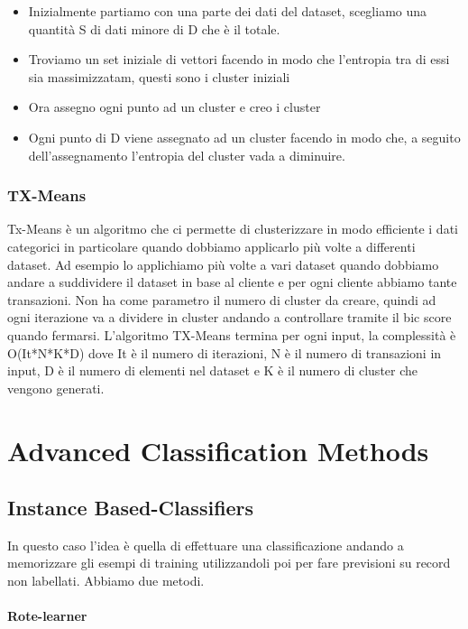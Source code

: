 \documentclass[14pt]{extreport}
\begin{document}
\begin{itemize}
    \item Inizialmente partiamo con una parte dei dati del dataset, scegliamo una quantità S di dati minore di D che è il totale.
    \item Troviamo un set iniziale di vettori facendo in modo che l'entropia tra di essi sia massimizzatam, questi sono i cluster iniziali
    \item Ora assegno ogni punto ad un cluster e creo i cluster
    \item Ogni punto di D viene assegnato ad un cluster facendo in modo che, a seguito dell'assegnamento l'entropia del cluster vada a diminuire.
\end{itemize}

\subsection{TX-Means}

Tx-Means è un algoritmo che ci permette di clusterizzare in modo efficiente i dati categorici in particolare quando dobbiamo applicarlo più volte a differenti dataset. Ad esempio lo applichiamo più volte a vari dataset quando dobbiamo andare a suddividere il dataset in base al cliente e per ogni cliente abbiamo tante transazioni.
Non ha come parametro il numero di cluster da creare, quindi ad ogni iterazione va a dividere in cluster andando a controllare tramite il bic score quando fermarsi.
L'algoritmo TX-Means termina per ogni input, la complessità è O(It*N*K*D) dove It è il numero di iterazioni, N è il numero di transazioni in input, D è il numero di elementi nel dataset e K è il numero di cluster che vengono generati.

\chapter{Advanced Classification Methods}

\section{Instance Based-Classifiers}

In questo caso l'idea è quella di effettuare una classificazione andando a memorizzare gli esempi di training utilizzandoli poi per fare previsioni su record non labellati.
Abbiamo due metodi.

\subsubsection{Rote-learner}
\end{document}
